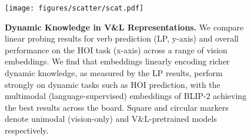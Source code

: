 \begin{figure}[t]
\center
    \texttt{[image: figures/scatter/scat.pdf]}
    \caption{
    \textbf{Dynamic Knowledge in V\&L Representations.}
    We compare linear probing results for verb prediction (LP, y-axis) and overall performance on the HOI task (x-axis) across a range of vision embeddings. We find that embeddings linearly encoding richer dynamic knowledge, as measured by the LP results, perform strongly on dynamic tasks such as HOI prediction, with the multimodal (language-supervised) embeddings of BLIP-2 achieving the best results across the board. 
    \footnotesize{Square and circular markers denote unimodal (vision-only) and V\&L-pretrained models respectively.}}
   
    \label{fig:scatter} 
\end{figure}
